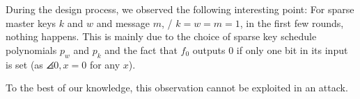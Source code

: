 During the design process, we observed the following interesting point:
For sparse master keys $k$ and $w$ and message $m$, \eg/ $k = w = m = 1$, in the first few rounds, nothing happens.
This is mainly due to the choice of sparse key schedule polynomials $p_w$ and $p_k$ and the fact that $f_0$ outputs $0$ if only one bit in its input is set (as $\angles{0, x} = 0$ for any $x$).


To the best of our knowledge, this observation cannot be exploited in an attack.

